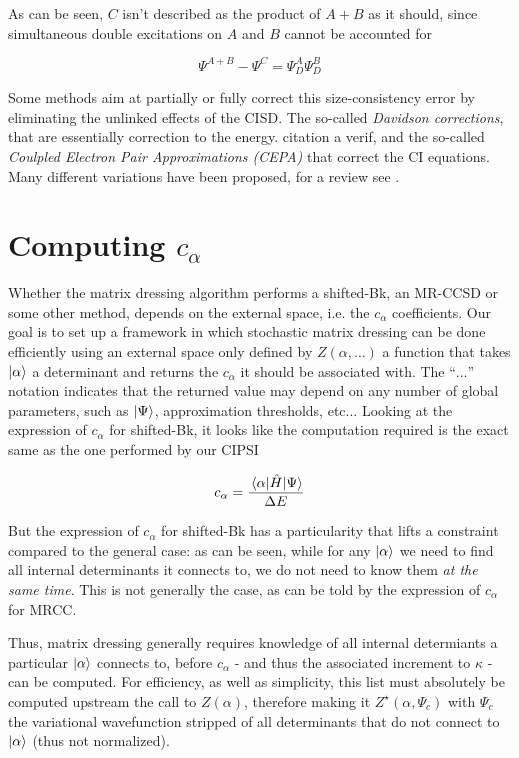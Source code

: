 \documentclass[./thesis.tex]{subfiles}
\begin{document}
As can be seen, $C$ isn't described as the product of $A+B$ as it should, since simultaneous double excitations on $A$ and $B$ cannot be accounted for

\begin{equation}
\Psi^{A+B} - \Psi^C  = \Psi_{D}^A \Psi_{D}^B
\end{equation}

Some methods aim at partially or fully correct this size-consistency error by eliminating the unlinked effects of the CISD. The so-called \emph{Davidson corrections}, that are essentially correction to the energy\cite{Langhoff_1974}. \alert{citation a verif}, and the so-called \emph{Coulpled Electron Pair Approximations (CEPA)} that correct the CI equations\cite{Kelly_1963,Kelly_1964,Meyer_1971,Meyer_1973,Meyer_1974,Ahlrichs_1975}. Many different variations have been proposed, for a review see \cite{Koch_1981}.




\section{Computing $c_\alpha$}
Whether the matrix dressing algorithm performs a shifted-Bk, an MR-CCSD or some other method, depends on the external space, i.e. the $c_\alpha$ coefficients. Our goal is to set up a framework in which stochastic matrix dressing can be done efficiently using an external space only defined by $Z(\alpha, \ldots)$ a function that takes ${\ket{\alpha}}$ a determinant and returns the $c_\alpha$ it should be associated with. The ``$\ldots$'' notation indicates that the returned value may depend on any number of global parameters, such as $\ket \Psi$, approximation thresholds, etc...
Looking at the expression of $c_\alpha$ for shifted-Bk, it looks like the computation required is the exact same as the one performed by our CIPSI

\begin{equation}
c_\alpha = \frac{\mel{\alpha}{\hat{H}}{\Psi}}{\Delta E}
\end{equation}


But the expression of $c_\alpha$ for shifted-Bk has a particularity that lifts a constraint compared to the general case: as can be seen, while for any ${\ket{\alpha}}$ we need to find all internal determinants it connects to, we do not need to know them \emph{at the same time}. This is not generally the case, as can be told by the expression of $c_\alpha$ for MRCC.

Thus, matrix dressing generally requires knowledge of all internal determiants a particular ${\ket{\alpha}}$ connects to, before $c_\alpha$ - and thus the associated increment to $\kappa$ - can be computed. For efficiency, as well as simplicity, this list must absolutely be computed upstream the call to $Z(\alpha)$, therefore making it $Z^\star(\alpha, \Psi_{c})$ with $\Psi_{c}$ the variational wavefunction stripped of all determinants that do not connect to ${\ket{\alpha}}$ (thus not normalized). 
\end{document}
